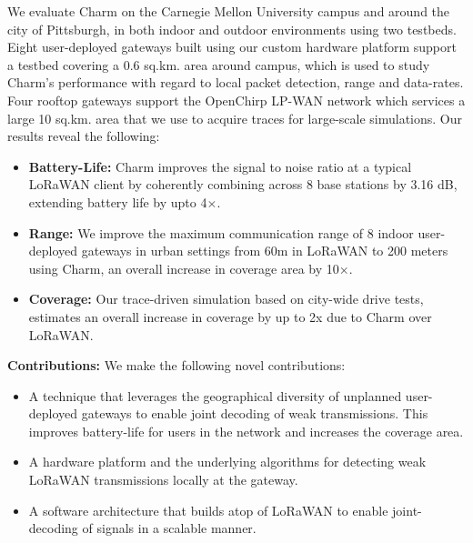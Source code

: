 We evaluate Charm on the Carnegie Mellon University campus and around the city
of Pittsburgh, in both indoor and outdoor environments using two testbeds.
Eight user-deployed gateways built using our custom hardware platform support
a testbed covering a 0.6 sq.km. area around campus, which is used to study
Charm's performance with regard to local packet detection, range and data-rates. Four
rooftop gateways support the OpenChirp LP-WAN network which services a large
10 sq.km. area that we use to acquire traces for large-scale simulations. Our
results reveal the following:

\begin{itemize}
    \item {\bf Battery-Life: }Charm improves the signal to noise ratio at a
        typical LoRaWAN client by coherently combining across 8 base stations
        by 3.16 dB, extending battery life by upto 4$\times$.
    \item {\bf Range: } We improve the maximum communication range of 8 indoor
        user-deployed gateways in urban settings from 60m in LoRaWAN to 200
        meters using Charm, an overall increase in coverage area by
        10$\times$.
    \item {\bf Coverage: } Our trace-driven simulation based on city-wide
        drive tests, estimates an overall increase in coverage by up to 2x due
        to Charm over LoRaWAN.
\end{itemize}

\noindent \textbf{Contributions:} We make the following novel contributions:
\begin{itemize}
    \item A technique that leverages the geographical diversity of unplanned
        user-deployed gateways to enable joint decoding of weak transmissions.
        This improves battery-life for users in the network and increases the
        coverage area.
    \item A hardware platform and the underlying algorithms for detecting weak
        LoRaWAN transmissions locally at the gateway.
    \item A software architecture that builds atop of LoRaWAN to enable
        joint-decoding of signals in a scalable manner.
\end{itemize}